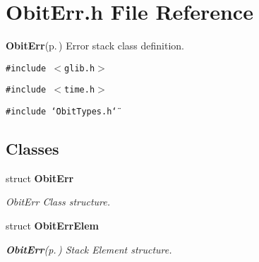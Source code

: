 \section{Obit\-Err.h File Reference}
\label{ObitErr_8h}
{\bf Obit\-Err}{\rm (p.\,\pageref{structObitErr})} Error stack class definition. 

{\tt \#include $<$glib.h$>$}\par
{\tt \#include $<$time.h$>$}\par
{\tt \#include \char`\"{}Obit\-Types.h\char`\"{}}\par
\subsection*{Classes}
\begin{CompactItemize}
\item 
struct {\bf Obit\-Err}
\begin{CompactList}\small\item\em Obit\-Err Class structure. \item\end{CompactList}\item 
struct {\bf Obit\-Err\-Elem}
\begin{CompactList}\small\item\em {\bf Obit\-Err}{\rm (p.\,\pageref{structObitErr})} Stack Element structure. \item\end{CompactList}\end{CompactItemize}
